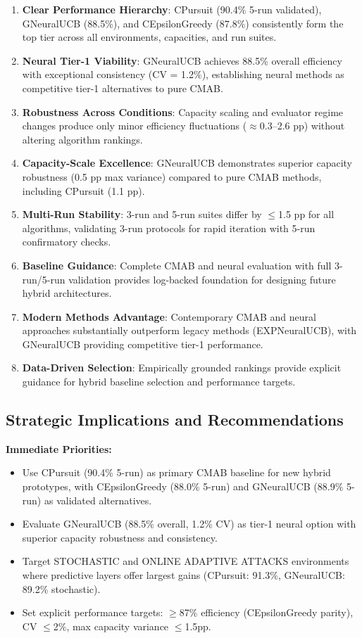 \documentclass[12pt,a4paper]{article}
\newcommand{\success}[1]{\textcolor{successcolor}{\textbf{#1}}}
\newcommand{\legacy}[1]{\textcolor{legacycolor}{\textbf{#1}}}
\newcommand{\neural}[1]{\textcolor{neuralcolor}{\textbf{#1}}}
\begin{document}
\begin{enumerate}
\item \textbf{Clear Performance Hierarchy}: CPursuit (90.4\% 5-run validated), GNeuralUCB (88.5\%), and CEpsilonGreedy (87.8\%) consistently form the top tier across all environments, capacities, and run suites.
\item \neural{Neural Tier-1 Viability}: GNeuralUCB achieves 88.5\% overall efficiency with exceptional consistency (CV = 1.2\%), establishing neural methods as competitive tier-1 alternatives to pure CMAB.
\item \textbf{Robustness Across Conditions}: Capacity scaling and evaluator regime changes produce only minor efficiency fluctuations ($\approx$0.3--2.6 pp) without altering algorithm rankings.
\item \neural{Capacity-Scale Excellence}: GNeuralUCB demonstrates superior capacity robustness (0.5 pp max variance) compared to pure CMAB methods, including CPursuit (1.1 pp).
\item \success{Multi-Run Stability}: 3-run and 5-run suites differ by $\leq$1.5 pp for all algorithms, validating 3-run protocols for rapid iteration with 5-run confirmatory checks.
\item \textbf{Baseline Guidance}: Complete CMAB and neural evaluation with full 3-run/5-run validation provides log-backed foundation for designing future hybrid architectures.
\item \legacy{Modern Methods Advantage}: Contemporary CMAB and neural approaches substantially outperform legacy methods (EXPNeuralUCB), with GNeuralUCB providing competitive tier-1 performance.
\item \textbf{Data-Driven Selection}: Empirically grounded rankings provide explicit guidance for hybrid baseline selection and performance targets.
\end{enumerate}

\subsection{Strategic Implications and Recommendations}

\textbf{Immediate Priorities:}
\begin{itemize}
\item Use CPursuit (90.4\% 5-run) as primary CMAB baseline for new hybrid prototypes, with CEpsilonGreedy (88.0\% 5-run) and GNeuralUCB (88.9\% 5-run) as validated alternatives.
\item Evaluate GNeuralUCB (88.5\% overall, 1.2\% CV) as tier-1 neural option with superior capacity robustness and consistency.
\item Target STOCHASTIC and ONLINE ADAPTIVE ATTACKS environments where predictive layers offer largest gains (CPursuit: 91.3\%, GNeuralUCB: 89.2\% stochastic).
\item Set explicit performance targets: $\geq$87\% efficiency (CEpsilonGreedy parity), CV $\leq$2\%, max capacity variance $\leq$1.5pp.
\end{itemize}
\end{document}
